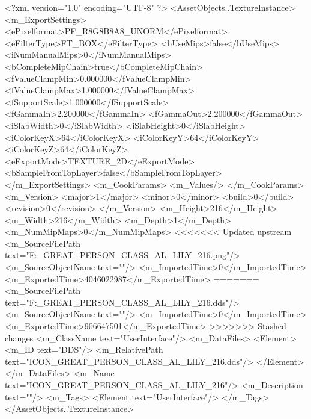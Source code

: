<?xml version="1.0" encoding="UTF-8" ?>
<AssetObjects..TextureInstance>
	<m_ExportSettings>
		<ePixelformat>PF_R8G8B8A8_UNORM</ePixelformat>
		<eFilterType>FT_BOX</eFilterType>
		<bUseMips>false</bUseMips>
		<iNumManualMips>0</iNumManualMips>
		<bCompleteMipChain>true</bCompleteMipChain>
		<fValueClampMin>0.000000</fValueClampMin>
		<fValueClampMax>1.000000</fValueClampMax>
		<fSupportScale>1.000000</fSupportScale>
		<fGammaIn>2.200000</fGammaIn>
		<fGammaOut>2.200000</fGammaOut>
		<iSlabWidth>0</iSlabWidth>
		<iSlabHeight>0</iSlabHeight>
		<iColorKeyX>64</iColorKeyX>
		<iColorKeyY>64</iColorKeyY>
		<iColorKeyZ>64</iColorKeyZ>
		<eExportMode>TEXTURE_2D</eExportMode>
		<bSampleFromTopLayer>false</bSampleFromTopLayer>
	</m_ExportSettings>
	<m_CookParams>
		<m_Values/>
	</m_CookParams>
	<m_Version>
		<major>1</major>
		<minor>0</minor>
		<build>0</build>
		<revision>0</revision>
	</m_Version>
	<m_Height>216</m_Height>
	<m_Width>216</m_Width>
	<m_Depth>1</m_Depth>
	<m_NumMipMaps>0</m_NumMipMaps>
<<<<<<< Updated upstream
	<m_SourceFilePath text="F:\DT\lilyimages\gpportrait\ICON_GREAT_PERSON_CLASS_AL_LILY_216.png"/>
	<m_SourceObjectName text=""/>
	<m_ImportedTime>0</m_ImportedTime>
	<m_ExportedTime>4046022987</m_ExportedTime>
=======
	<m_SourceFilePath text="F:\DT\lilyimages\all\ICON_GREAT_PERSON_CLASS_AL_LILY_216.dds"/>
	<m_SourceObjectName text=""/>
	<m_ImportedTime>0</m_ImportedTime>
	<m_ExportedTime>906647501</m_ExportedTime>
>>>>>>> Stashed changes
	<m_ClassName text="UserInterface"/>
	<m_DataFiles>
		<Element>
			<m_ID text="DDS"/>
			<m_RelativePath text="ICON_GREAT_PERSON_CLASS_AL_LILY_216.dds"/>
		</Element>
	</m_DataFiles>
	<m_Name text="ICON_GREAT_PERSON_CLASS_AL_LILY_216"/>
	<m_Description text=""/>
	<m_Tags>
		<Element text="UserInterface"/>
	</m_Tags>
</AssetObjects..TextureInstance>

